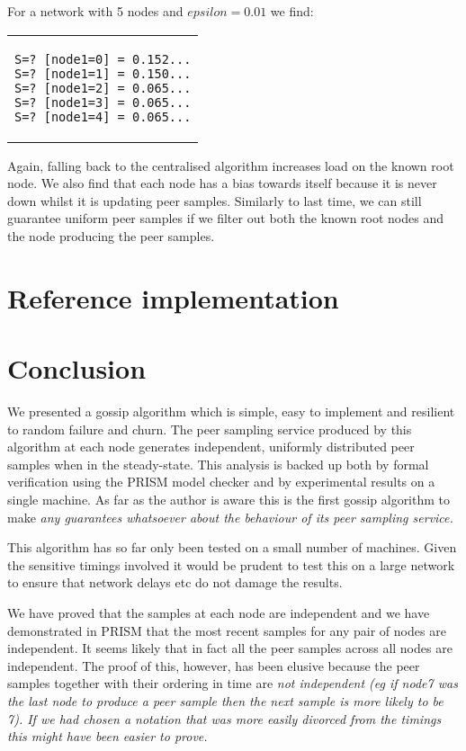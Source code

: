 \documentclass[a4paper,10pt]{article}
\newcommand{\prismmodel}[1]{
  \begin{quotation}
  \footnotesize
  
  \end{quotation}
}
\newenvironment{prismprop}[0]{
  \begin{center}
  \begin{tabular}{c}
  \footnotesize
}{
  \end{tabular}
  \end{center}
}
\begin{document}
\prismmodel{ctmc_full_churn}

For a network with 5 nodes and $epsilon=0.01$ we find:

\begin{prismprop}
\begin{lstlisting}
S=? [node1=0] = 0.152...
S=? [node1=1] = 0.150...
S=? [node1=2] = 0.065...
S=? [node1=3] = 0.065...
S=? [node1=4] = 0.065...
\end{lstlisting}
\end{prismprop}

Again, falling back to the centralised algorithm increases load on the known root node. We also find that each node has a bias towards itself because it is never down whilst it is updating peer samples. Similarly to last time, we can still guarantee uniform peer samples if we filter out both the known root nodes and the node producing the peer samples.

\section{Reference implementation}

\section{Conclusion}

We presented a gossip algorithm which is simple, easy to implement and resilient to random failure and churn. The peer sampling service produced by this algorithm at each node generates independent, uniformly distributed peer samples when in the steady-state. This analysis is backed up both by formal verification using the PRISM model checker and by experimental results on a single machine. As far as the author is aware this is the first gossip algorithm to make \em any \em guarantees whatsoever about the behaviour of its peer sampling service.

This algorithm has so far only been tested on a small number of machines. Given the sensitive timings involved it would be prudent to test this on a large network to ensure that network delays etc do not damage the results.

We have proved that the samples at each node are independent and we have demonstrated in PRISM that the most recent samples for any pair of nodes are independent. It seems likely that in fact all the peer samples across all nodes are independent. The proof of this, however, has been elusive because the peer samples together with their ordering in time are \em not \em independent (eg if node7 was the last node to produce a peer sample then the next sample is more likely to be 7). If we had chosen a notation that was more easily divorced from the timings this might have been easier to prove.
\end{document}
